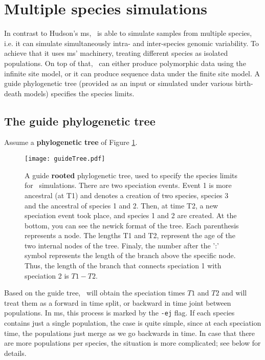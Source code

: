 \section{Multiple species simulations}

In contrast to Hudson's ms, \comus\  is able to simulate samples from multiple species, i.e. it can simulate simultaneously intra- and inter-species genomic variability. To achieve that it uses ms' machinery, treating different species as isolated populations. On top of that, \comus\ can either produce polymorphic data using the infinite site model, or it can produce sequence data under the finite site model. A guide phylogenetic tree (provided as an input or simulated under various birth-death models) specifies the species limits.

\subsection{ The guide phylogenetic tree }

Assume a {\bf phylogenetic tree } of Figure \ref{fig:1}.


\begin{figure}[htbp!]
\texttt{[image: guideTree.pdf]}
\caption{A guide {\bf rooted} phylogenetic tree, used to specify the species limits for \comus\ simulations. There are two speciation events. Event 1 is more ancestral (at T1) and denotes a creation of two species, species 3 and the ancestral of species 1 and 2. Then, at time T2, a new speciation event took place, and species 1 and 2 are created. At the bottom, you can see the newick format of the tree. Each parenthesis represents a node. The lengths T1 and T2, represent the age of the two internal nodes of the tree. Finaly, the number after the ':' symbol represents the length of the branch above the specific node. Thus, the length of the branch that connects speciation 1 with speciation 2 is $T1 - T2$. }
\label{fig:1}

\end{figure}

Based on the guide tree, \comus\ will obtain the speciation times $T1$ and $T2$ and will treat them as a forward in time split, or backward in time joint between populations. In ms, this process is marked by the \verb!-ej! flag. If each species contains just a single population, the case is quite simple, since at each speciation time, the populations just merge as we go backwards in time. In case that there are more populations per species, the situation is more complicated; see below for details. 


